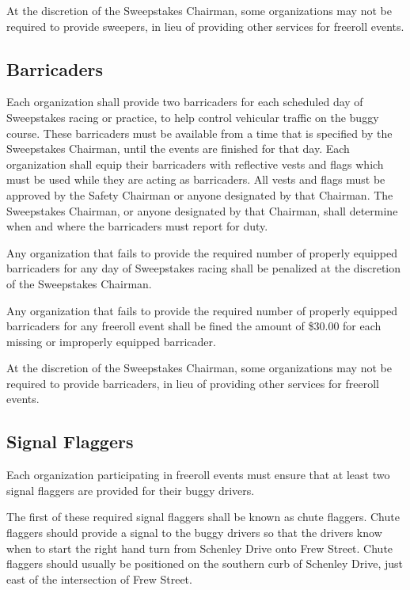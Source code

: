 	At the discretion of the Sweepstakes Chairman, some organizations may not be required to provide sweepers, in lieu of providing other services for freeroll events.

\subsection{Barricaders}
\label{subsec:Barricaders}

	Each organization shall provide two barricaders for each scheduled day of Sweepstakes racing or practice, to help control vehicular traffic on the buggy course. These barricaders must be available from a time that is specified by the Sweepstakes Chairman, until the events are finished for that day. Each organization shall equip their barricaders with reflective vests and flags which must be used while they are acting as barricaders. All vests and flags must be approved by the Safety Chairman or anyone designated by that Chairman. The Sweepstakes Chairman, or anyone designated by that Chairman, shall determine when and where the barricaders must report for duty.

	Any organization that fails to provide the required number of properly equipped barricaders for any day of Sweepstakes racing shall be penalized at the discretion of the Sweepstakes Chairman.

	Any organization that fails to provide the required number of properly equipped barricaders for any freeroll event shall be fined the amount of \$30.00 for each missing or improperly equipped barricader.

	At the discretion of the Sweepstakes Chairman, some organizations may not be required to provide barricaders, in lieu of providing other services for freeroll events.
	
\subsection{Signal Flaggers}
\label{subsec:Flaggers}

	Each organization participating in freeroll events must ensure that at least two signal flaggers are provided for their buggy drivers.

	The first of these required signal flaggers shall be known as chute flaggers. Chute flaggers should provide a signal to the buggy drivers so that the drivers know when to start the right hand turn from Schenley Drive onto Frew Street. Chute flaggers should usually be positioned on the southern curb of Schenley Drive, just east of the intersection of Frew Street.

